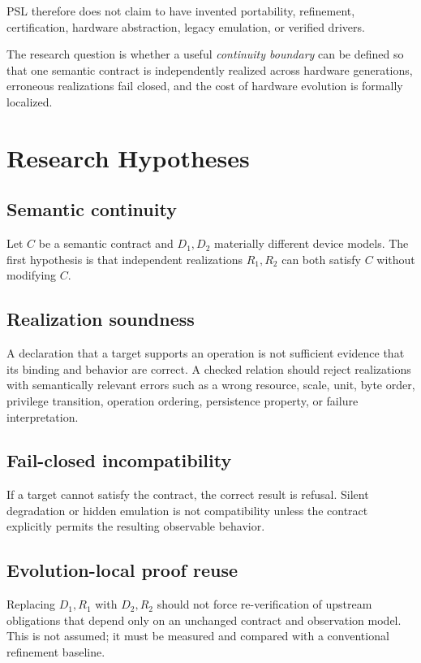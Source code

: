 \documentclass[11pt,a4paper]{article}
\begin{document}
PSL therefore does not claim to have invented portability, refinement,
certification, hardware abstraction, legacy emulation, or verified drivers.

The research question is whether a useful \emph{continuity boundary} can be
defined so that one semantic contract is independently realized across
hardware generations, erroneous realizations fail closed, and the cost of
hardware evolution is formally localized.

\section{Research Hypotheses}

\subsection{Semantic continuity}

Let $C$ be a semantic contract and $D_1,D_2$ materially different device
models. The first hypothesis is that independent realizations $R_1,R_2$ can
both satisfy $C$ without modifying $C$.

\subsection{Realization soundness}

A declaration that a target supports an operation is not sufficient evidence
that its binding and behavior are correct. A checked relation should reject
realizations with semantically relevant errors such as a wrong resource,
scale, unit, byte order, privilege transition, operation ordering,
persistence property, or failure interpretation.

\subsection{Fail-closed incompatibility}

If a target cannot satisfy the contract, the correct result is refusal. Silent
degradation or hidden emulation is not compatibility unless the contract
explicitly permits the resulting observable behavior.

\subsection{Evolution-local proof reuse}

Replacing $D_1,R_1$ with $D_2,R_2$ should not force re-verification of upstream
obligations that depend only on an unchanged contract and observation model.
This is not assumed; it must be measured and compared with a conventional
refinement baseline.
\end{document}
